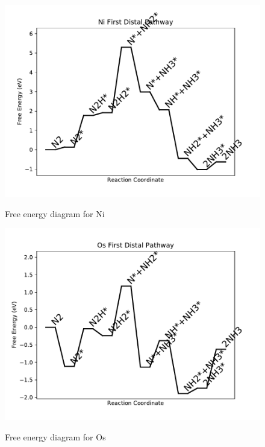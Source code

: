 \documentclass{article}
\begin{document}
\begin{figure}
\includegraphics[width=1\linewidth]{data/plots/Ni_distal_1.pdf}
\label{fig:Ni_distal_1}
\caption{Free energy diagram for Ni}
\end{figure}

\clearpage
\begin{figure}
\includegraphics[width=1\linewidth]{data/plots/Os_distal_1.pdf}
\label{fig:Os_distal_1}
\caption{Free energy diagram for Os}
\end{figure}
\end{document}
